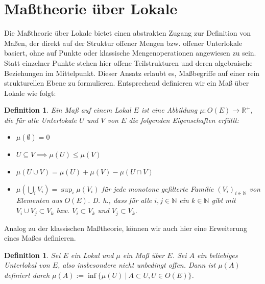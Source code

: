\documentclass{article}
\newtheorem{definition}[satz]{Definition}
\begin{document}
\section{Maßtheorie über Lokale}
Die Maßtheorie über Lokale bietet einen abstrakten Zugang zur Definition von Maßen, der direkt auf der Struktur offener Mengen bzw. offener Unterlokale basiert, ohne auf Punkte oder klassische Mengenoperationen angewiesen zu sein. Statt einzelner Punkte stehen hier offene Teilstrukturen und deren algebraische Beziehungen im Mittelpunkt. Dieser Ansatz erlaubt es, Maßbegriffe auf einer rein strukturellen Ebene zu formulieren. Entsprechend definieren wir ein Maß über Lokale wie folgt:

\begin{definition}
Ein Maß auf einem Lokal $E$ ist eine Abbildung $\mu:O(E)\to \mathbb{R}^{+}$, die für alle Unterlokale $U$ und $V$ von $E$ die folgenden Eigenschaften erfüllt:  
\begin{itemize}
\item $\mu(\emptyset)=0$  
\item $U\subseteq V\implies\mu(U)\leq\mu(V) $ 
\item $\mu(U\cup V)=\mu(U)+\mu(V)-\mu(U\cap V)$  
\item $\mu\left(\bigcup_i V_i\right)=\sup_i\mu(V_i)$ für jede monotone gefilterte Familie $(V_i)_{i\in\mathbb{N}}$ von Elementen aus $O(E)$. D. h., dass für alle $i,j\in\mathbb{N}$ ein $k\in\mathbb{N}$ gibt mit $V_i\cup V_j\subset V_k$ bzw. $V_i\subset V_k$ und $V_j\subset V_k$.
\end{itemize}

\end{definition}
Analog zu der klassischen Maßtheorie, können wir auch hier eine Erweiterung eines Maßes definieren.

\begin{definition}
Sei $E$ ein Lokal und $\mu$ ein Maß über $E$. Sei $A$ ein beliebiges Unterlokal von $E$, also insbesondere nicht unbedingt offen. Dann ist $\mu (A)$ definiert durch $\mu (A):=\inf\{\mu (U)~|~A\subset U, U\in O(E)\}$.
\end{definition}
\end{document}
